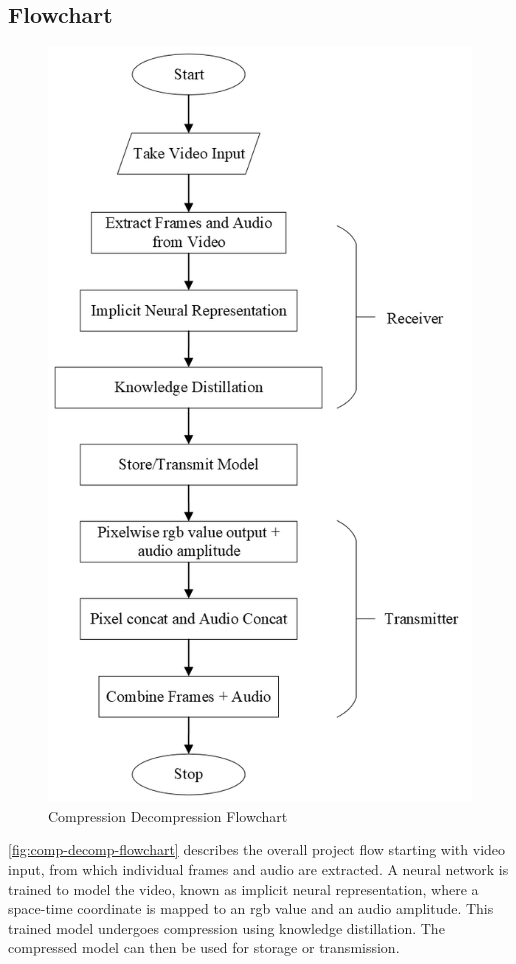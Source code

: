 \documentclass{ioereport}
\begin{document}
    \subsection{Flowchart}
    \begin{figure}[H]
        \centering
        \includegraphics[height=0.7\textheight]{assets/Major Compression Decompression Flowchart.png}
        \caption{Compression Decompression Flowchart}
        \label{fig:comp-decomp-flowchart}
    \end{figure}
    \autoref{fig:comp-decomp-flowchart} describes the overall project flow starting with video input, from which individual frames and audio are extracted. A neural network is trained to model the video, known as implicit neural representation, where a space-time coordinate is mapped to an \gls{rgb} value and an audio amplitude. This trained model undergoes compression using knowledge distillation. The compressed model can then be used for storage or transmission.
\end{document}
